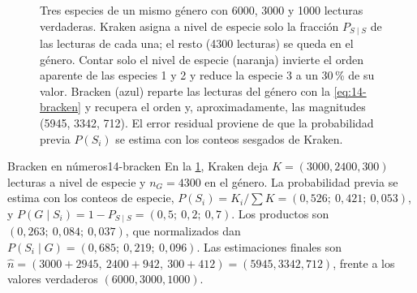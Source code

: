 \begin{figure}[t]
\centering

\caption[Redistribución de lecturas con Bracken]{Tres especies de un mismo género con \num{6000}, \num{3000} y \num{1000} lecturas verdaderas. Kraken asigna a nivel de especie solo la fracción $P_{S\mid S}$ de las lecturas de cada una; el resto (\num{4300} lecturas) se queda en el género. Contar solo el nivel de especie (naranja) invierte el orden aparente de las especies 1 y 2 y reduce la especie 3 a un 30\,\% de su valor. Bracken (azul) reparte las lecturas del género con la \cref{eq:14-bracken} y recupera el orden y, aproximadamente, las magnitudes (\num{5945}, \num{3342}, \num{712}). El error residual proviene de que la probabilidad previa $P(S_i)$ se estima con los conteos sesgados de Kraken.}
\label{fig:14-bracken}
\end{figure}

\begin{ejemplo}{Bracken en números}{14-bracken}
En la \cref{fig:14-bracken}, Kraken deja $K=(3000, 2400, 300)$ lecturas a nivel de especie y $n_G = \num{4300}$ en el género. La probabilidad previa se estima con los conteos de especie, $P(S_i) = K_i/\sum K = (0{,}526;\ 0{,}421;\ 0{,}053)$, y $P(G\mid S_i) = 1 - P_{S\mid S} = (0{,}5;\ 0{,}2;\ 0{,}7)$. Los productos son $(0{,}263;\ 0{,}084;\ 0{,}037)$, que normalizados dan $P(S_i\mid G) = (0{,}685;\ 0{,}219;\ 0{,}096)$. Las estimaciones finales son $\hat{n} = (3000 + 2945,\ 2400 + 942,\ 300 + 412) = (\num{5945}, \num{3342}, \num{712})$, frente a los valores verdaderos $(\num{6000}, \num{3000}, \num{1000})$.
\end{ejemplo}

